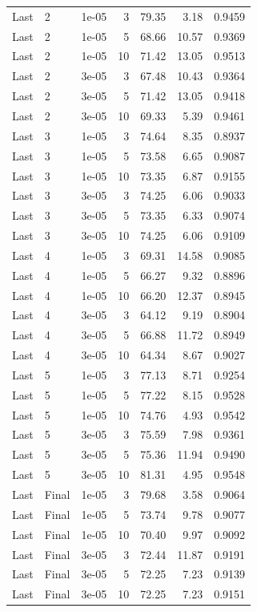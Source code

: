 \documentclass[11pt,a4paper]{article}
\begin{document}
\begin{longtable}{@{}llrrrrr@{}}
Last & 2 & 1e-05 & 3 & 79.35 & 3.18 & 0.9459 \\
Last & 2 & 1e-05 & 5 & 68.66 & 10.57 & 0.9369 \\
Last & 2 & 1e-05 & 10 & 71.42 & 13.05 & 0.9513 \\
Last & 2 & 3e-05 & 3 & 67.48 & 10.43 & 0.9364 \\
Last & 2 & 3e-05 & 5 & 71.42 & 13.05 & 0.9418 \\
Last & 2 & 3e-05 & 10 & 69.33 & 5.39 & 0.9461 \\
Last & 3 & 1e-05 & 3 & 74.64 & 8.35 & 0.8937 \\
Last & 3 & 1e-05 & 5 & 73.58 & 6.65 & 0.9087 \\
Last & 3 & 1e-05 & 10 & 73.35 & 6.87 & 0.9155 \\
Last & 3 & 3e-05 & 3 & 74.25 & 6.06 & 0.9033 \\
Last & 3 & 3e-05 & 5 & 73.35 & 6.33 & 0.9074 \\
Last & 3 & 3e-05 & 10 & 74.25 & 6.06 & 0.9109 \\
Last & 4 & 1e-05 & 3 & 69.31 & 14.58 & 0.9085 \\
Last & 4 & 1e-05 & 5 & 66.27 & 9.32 & 0.8896 \\
Last & 4 & 1e-05 & 10 & 66.20 & 12.37 & 0.8945 \\
Last & 4 & 3e-05 & 3 & 64.12 & 9.19 & 0.8904 \\
Last & 4 & 3e-05 & 5 & 66.88 & 11.72 & 0.8949 \\
Last & 4 & 3e-05 & 10 & 64.34 & 8.67 & 0.9027 \\
Last & 5 & 1e-05 & 3 & 77.13 & 8.71 & 0.9254 \\
Last & 5 & 1e-05 & 5 & 77.22 & 8.15 & 0.9528 \\
Last & 5 & 1e-05 & 10 & 74.76 & 4.93 & 0.9542 \\
Last & 5 & 3e-05 & 3 & 75.59 & 7.98 & 0.9361 \\
Last & 5 & 3e-05 & 5 & 75.36 & 11.94 & 0.9490 \\
Last & 5 & 3e-05 & 10 & 81.31 & 4.95 & 0.9548 \\
Last & Final & 1e-05 & 3 & 79.68 & 3.58 & 0.9064 \\
Last & Final & 1e-05 & 5 & 73.74 & 9.78 & 0.9077 \\
Last & Final & 1e-05 & 10 & 70.40 & 9.97 & 0.9092 \\
Last & Final & 3e-05 & 3 & 72.44 & 11.87 & 0.9191 \\
Last & Final & 3e-05 & 5 & 72.25 & 7.23 & 0.9139 \\
Last & Final & 3e-05 & 10 & 72.25 & 7.23 & 0.9151 \\
\end{longtable}
\endgroup
\clearpage
\end{document}
